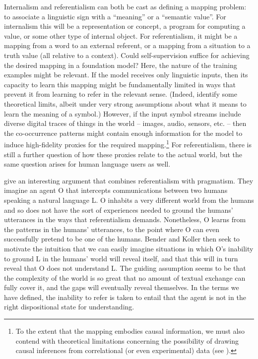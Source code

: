 Internalism and referentialism can both be cast as defining a mapping problem: to associate a linguistic sign with a ``meaning'' or a ``semantic value''. For internalism this will be a representation or concept, a program for computing a value, or some other type of internal object. For referentialism, it might be a mapping from a word to an external referent, or a mapping from a situation to a truth value (all relative to a context). Could self-supervision suffice for achieving the desired mapping in a foundation model? Here, the nature of the training examples might be relevant. If the model receives only linguistic inputs, then its capacity to learn this mapping might be fundamentally limited in ways that prevent it from learning to refer in the relevant sense. (Indeed, \citet{merrill2021provable} identify some theoretical limits, albeit under very strong assumptions about what it means to learn the meaning of a symbol.) However, if the input symbol streams include diverse digital traces of things in the world – images, audio, sensors, etc. – then the co-occurrence patterns might contain enough information for the model to induce high-fidelity proxies for the required mapping.\footnote{To the extent that the mapping embodies causal information, we must also contend with theoretical limitations concerning the possibility of drawing causal inferences from correlational  (or even experimental) data (see \citealt{Spirtes2001,BCII2020}).} For referentialism, there is still a further question of how these proxies relate to the actual world, but the same question arises for human language users as well.

\citet{bender2020climbing} give an interesting argument that combines referentialism with pragmatism. They imagine an agent O that intercepts communications between two humans speaking a natural language L. O inhabits a very different world from the humans and so does not have the sort of experiences needed to ground the humans’ utterances in the ways that referentialism demands. Nonetheless, O learns from the patterns in the humans’ utterances, to the point where O can even successfully pretend to be one of the humans. Bender and Koller then seek to motivate the intuition that we can easily imagine situations in which O’s inability to ground L in the humans’ world will reveal itself, and that this will in turn reveal that O does not understand L. The guiding assumption seems to be that the complexity of the world is so great that no amount of textual exchange can fully cover it, and the gaps will eventually reveal themselves. In the terms we have defined, the inability to refer is taken to entail that the agent is not in the right dispositional state for understanding.

